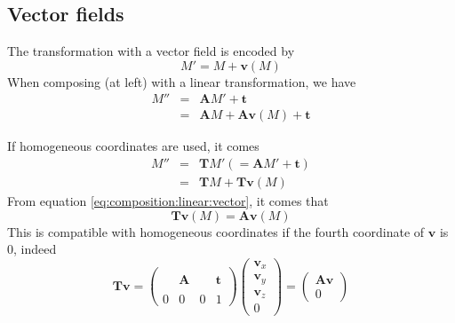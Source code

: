 \subsection{Vector fields}

The transformation with a vector field is encoded by 
\begin{displaymath}
M' = M + \mathbf{v}(M)
\end{displaymath}
When composing (at left) with a linear transformation, we have
\begin{eqnarray}
M'' & = & \mathbf{A} M' + \mathbf{t} \nonumber \\
& = & \mathbf{A} M + \mathbf{A} \mathbf{v}(M) + \mathbf{t}
\label{eq:composition:linear:vector}
\end{eqnarray}

If homogeneous coordinates are used, it comes
\begin{eqnarray*}
M'' & = & \mathbf{T} M' 
\left( = \mathbf{A} M' + \mathbf{t} \right) \\
& = & \mathbf{T} M + \mathbf{T} \mathbf{v}(M) 
\end{eqnarray*}
From equation \ref{eq:composition:linear:vector}, it comes that 
\begin{displaymath}
\mathbf{T} \mathbf{v}(M) = \mathbf{A} \mathbf{v}(M)
\end{displaymath}
This is compatible with homogeneous coordinates if the fourth coordinate of $\mathbf{v}$ is $0$, indeed
\begin{displaymath}
\mathbf{T} \mathbf{v}
= 
\left(
\begin{array}{ccc|c}
& & & \\
& \mathbf{A} & & \mathbf{t} \\
& & & \\ \hline
0 & 0 & 0 & 1
\end{array}
\right)
\left(
\begin{array}{c}
\mathbf{v}_x \\ \mathbf{v}_y \\ \mathbf{v}_z \\ 0
\end{array}
\right)
= 
\left(
\begin{array}{c}
\mathbf{A} \mathbf{v} \\ \hline
0
\end{array}
\right)
\end{displaymath}













